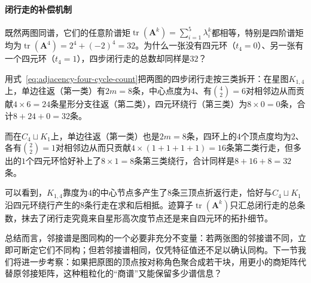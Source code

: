 \paragraph{闭行走的补偿机制}

既然两图同谱，它们的任意阶谱矩$\operatorname{tr}(\bm A^k)=\sum_{i=1}^5\lambda_i^k$都相等，特别是四阶谱矩均为$\operatorname{tr}(\bm A^4)=2^4+(-2)^4=32$。为什么一张没有四元环（$t_4=0$）、另一张有一个四元环（$t_4=1$），四步闭行走的总数却同样是$32$？

用式~\eqref{eq:adjacency-four-cycle-count}把两图的四步闭行走按三类拆开：在星图$K_{1,4}$上，单边往返（第一类）有$2m=8$条，中心点度为$4$、有$\binom{4}{2}=6$对相邻边从而贡献$4\times 6=24$条星形分支往返（第二类），四元环绕行（第三类）为$8\times 0=0$条，合计$8+24+0=32$条。

而在$C_4\sqcup K_1$上，单边往返（第一类）也是$2m=8$条，四环上的$4$个顶点度均为$2$、各有$\binom{2}{2}=1$对相邻边从而只贡献$4\times(1+1+1+1)=16$条第二类行走，但多出的$1$个四元环恰好补上了$8\times 1=8$条第三类绕行，合计同样是$8+16+8=32$条。

可以看到，$K_{1,4}$靠度为$4$的中心节点多产生了$8$条三顶点折返行走，恰好与$C_4\sqcup K_1$沿四元环绕行产生的$8$条行走在求和后相抵。迹算子$\operatorname{tr}(\bm A^k)$只汇总闭行走的总条数，抹去了闭行走究竟来自星形高次度节点还是来自四元环的拓扑细节。

总结而言，邻接谱是图同构的一个必要非充分不变量：若两张图的邻接谱不同，立即可断定它们不同构；但若邻接谱相同，仅凭特征值还不足以确认同构。下一节我们将进一步考察：如果把原图的顶点按对称角色聚合成若干块，用更小的商矩阵代替原邻接矩阵，这种粗粒化的“商谱”又能保留多少谱信息？
